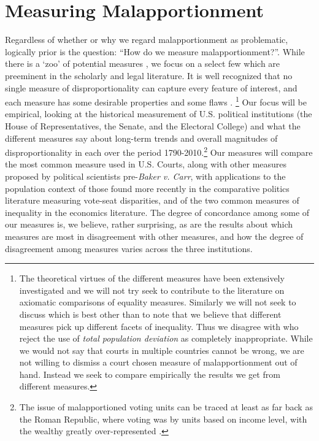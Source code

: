 \section{Measuring Malapportionment} \label{sec:measuring}
%
Regardless of whether or why we regard malapportionment as problematic, logically prior is the question: ``How do we measure malapportionment?''. While there is a `zoo' of potential measures \citep{TaageperaGrofman2003}, we focus on a select few which are preeminent in the scholarly and legal literature. It is well recognized that no single measure of disproportionality can capture every feature of interest, and each measure has some desirable properties and some flaws \citep{Cox1991, Monroe1994, Taagepera2013}. \footnote{The theoretical virtues of the different measures have been extensively investigated \citep{Monroe1994, TaageperaGrofman2003, Karpov2008, VanPuyenbroeck2008} and we will not try seek to contribute to the literature on axiomatic comparisons of equality measures. Similarly we will not seek to discuss which is best other than to note that we believe that different measures pick up different facets of inequality. Thus we disagree with \citet[][]{SamuelsSnyder2001} who reject the use of \textit{total population deviation} as completely inappropriate. While we would not say that courts in multiple countries cannot be wrong, we are not willing to dismiss a court chosen measure of malapportionment out of hand. Instead we seek to compare empirically the results we get from different measures.} Our focus will be empirical, looking at the historical measurement of U.S. political institutions (the House of Representatives, the Senate, and the Electoral College) and what the different measures say about long-term trends and overall magnitudes of disproportionality in each over the period 1790-2010.\footnote{The issue of malapportioned voting units can be traced at least as far back as the Roman Republic, where voting was by units based on income level, with the wealthy greatly over-represented \citep{Manin1997}.} Our measures will compare the most common measure used in U.S. Courts, along with other measures proposed by political scientists pre-\textit{Baker v. Carr}, with applications to the population context of those found more recently in the comparative politics literature measuring vote-seat disparities, and of the two common measures of inequality in the economics literature. The degree of concordance among some of our measures is, we believe, rather surprising, as are the results about which measures are most in disagreement with other measures, and how the degree of disagreement among measures varies across the three institutions.


